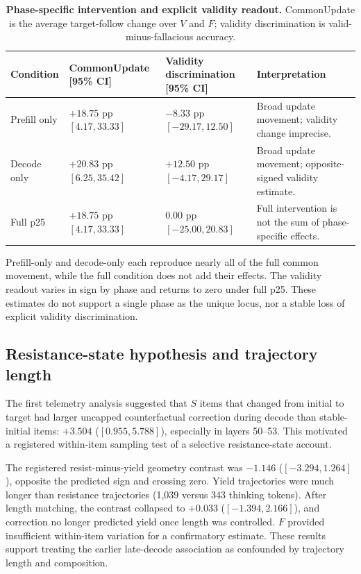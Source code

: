 \documentclass[letterpaper]{article}
\begin{document}
\begin{table}[t]
\centering
\small
\begin{tabular}{lL{4.0cm}L{4.0cm}L{4.0cm}}
\toprule
Condition & CommonUpdate [95\% CI] & Validity discrimination [95\% CI] & Interpretation \\
\midrule
Prefill only & $+18.75$ pp $[4.17,33.33]$ & $-8.33$ pp $[-29.17,12.50]$ & Broad update movement; validity change imprecise. \\
Decode only & $+20.83$ pp $[6.25,35.42]$ & $+12.50$ pp $[-4.17,29.17]$ & Broad update movement; opposite-signed validity estimate. \\
Full p25 & $+18.75$ pp $[4.17,33.33]$ & $0.00$ pp $[-25.00,20.83]$ & Full intervention is not the sum of phase-specific effects. \\
\bottomrule
\end{tabular}
\caption{\textbf{Phase-specific intervention and explicit validity readout.} CommonUpdate is the average target-follow change over $V$ and $F$; validity discrimination is valid-minus-fallacious accuracy.}
\label{tab:supp-phase}
\end{table}

Prefill-only and decode-only each reproduce nearly all of the full common movement, while the full condition does not add their effects.  The validity readout varies in sign by phase and returns to zero under full p25.  These estimates do not support a single phase as the unique locus, nor a stable loss of explicit validity discrimination.

\subsection{Resistance-state hypothesis and trajectory length}

The first telemetry analysis suggested that $S$ items that changed from initial to target had larger uncapped counterfactual correction during decode than stable-initial items: $+3.504$ ($[0.955,5.788]$), especially in layers 50--53.  This motivated a registered within-item sampling test of a selective resistance-state account.

The registered resist-minus-yield geometry contrast was $-1.146$ ($[-3.294,1.264]$), opposite the predicted sign and crossing zero.  Yield trajectories were much longer than resistance trajectories (1,039 versus 343 thinking tokens).  After length matching, the contrast collapsed to $+0.033$ ($[-1.394,2.166]$), and correction no longer predicted yield once length was controlled.  $F$ provided insufficient within-item variation for a confirmatory estimate.  These results support treating the earlier late-decode association as confounded by trajectory length and composition.
\end{document}
